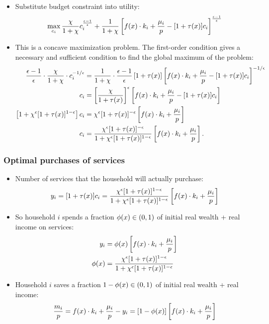 \documentclass[11pt,aspectratio=169,xcolor={dvipsnames},hyperref={pdftex,pdfpagemode=UseNone,hidelinks,pdfdisplaydoctitle=true},usepdftitle=false]{beamer}
\begin{document}
\begin{frame}
\begin{itemize}
\item Substitute budget constraint into utility: 
\begin{equation*}
\max_{c_{i}} \frac{\c}{1 + \c}c_{i}^{\frac{\e - 1}{\e}} + \frac{1}{1 + \c}\bs{f(x) \cdot k_i + \frac{\m_i}{p} - [1+\tau(x)] c_i}^{\frac{\e - 1}{\e}}
\end{equation*}
\item This is a concave maximization problem. The first-order condition gives a necessary and sufficient condition to find the global maximum of the problem:
\begin{align*}
\frac{\epsilon - 1}{\epsilon} \cdot \frac{\chi}{1 + \chi}\cdot c_i^{-1/\epsilon} &= \frac{1}{1 + \chi}\cdot\frac{\epsilon - 1}{\epsilon} \left[ 1+\tau(x) \right] \left[ f(x) \cdot k_i + \frac{\mu_i}{p} - [1+\tau(x)] c_i  \right]^{- 1/\epsilon}\\
c_i &= \left[ \frac{\chi}{1 + \tau(x)} \right]^{\epsilon} \left[ f(x)\cdot k_i + \frac{\mu_i}{p} - [1+\tau(x)] c_i \right]\\
\left[ 1 + \chi^{\epsilon}[1+\tau(x)]^{1 - \epsilon} \right] c_i &= \chi^{\epsilon}[1+\tau(x)]^{-\epsilon} \left[ f(x)\cdot k_i + \frac{\mu_i}{p} \right]\\
c_i &= \frac{\chi^{\epsilon}[1+\tau(x)]^{-\epsilon}}{1 + \chi^{\epsilon}[1+\tau(x)]^{1 - \epsilon}}\left[ f(x)\cdot k_i + \frac{\mu _i}{p} \right].
\end{align*}
\end{itemize}
\end{frame}

\begin{frame}
\frametitle{Optimal purchases of services}
\begin{itemize}
\item Number of services that the household will actually purchase:
\begin{equation*}
y_i = [1+\tau(x)] c_i = \frac{\chi^{\epsilon} [1+\tau(x)]^{1 - \epsilon}}{1 + \chi^{\epsilon}[1+\tau(x)]^{1 - \epsilon}}\left[ f(x)\cdot k_i + \frac{\mu_i}{p} \right]
\end{equation*}
\item So household $i$ spends a fraction $\phi(x) \in (0,1)$ of initial real wealth + real income on services:
\begin{align*}
y_i &= \phi(x)\left[ f(x)\cdot k_i + \frac{\mu_i}{p} \right]\\
\phi(x) &= \frac{\chi^{\epsilon} [1+\tau(x)]^{1 - \epsilon}}{1 + \chi^{\epsilon}[1+\tau(x)]^{1 - \epsilon}}
\end{align*}
\item Household $i$ saves a fraction $1-\phi(x) \in (0,1)$ of initial real wealth + real income:
\begin{equation*}
\frac{m_i}{p} = f(x)\cdot k_i + \frac{\mu_i}{p} - y_i = [1-\phi(x)]\left[ f(x)\cdot k_i + \frac{\mu_i}{p} \right]
\end{equation*}
\end{itemize}	
\end{frame}
\end{document}
